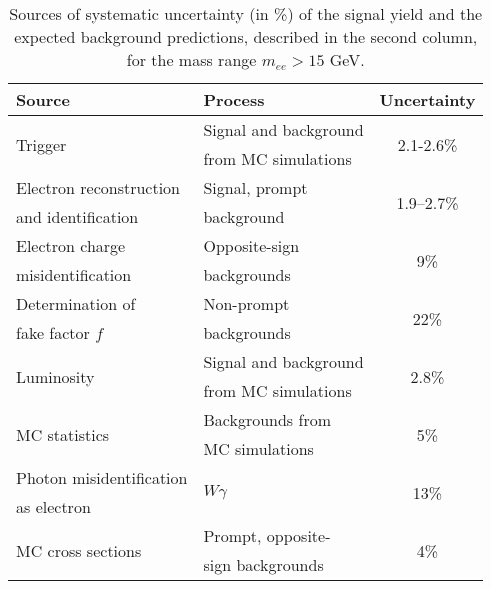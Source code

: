 \begin{table}[ht]
\begin{center}
\begin{tabular}{l|l|c}
Source & Process & Uncertainty \\
\hline
\multirow{2}{*}{Trigger} & Signal and background & \multirow{2}{*}{2.1-2.6\%}  \\
& from MC simulations &\\
\hline
Electron reconstruction & Signal, prompt &\multirow{2}{*}{1.9--2.7\%}\\
and identification & background&\\\hline
Electron charge  & Opposite-sign& \multirow{2}{*}{9\%} \\
misidentification& backgrounds&\\\hline
Determination of & Non-prompt &\multirow{2}{*}{22\%}\\
fake factor $f$& backgrounds&  \\\hline
\multirow{2}{*}{Luminosity} & Signal and background& \multirow{2}{*}{2.8\%}\\
& from MC simulations&\\\hline
\multirow{2}{*}{MC statistics} & Backgrounds from &  \multirow{2}{*}{5\%}\\
& MC simulations &\\\hline
Photon misidentification & \multirow{2}{*}{$W\gamma$} & \multirow{2}{*}{13\%}\\
as electron&&\\\hline
\multirow{2}{*}{MC cross sections} & Prompt, opposite-& \multirow{2}{*}{4\%}\\
& sign backgrounds & \\
\end{tabular}
\end{center}
\caption{Sources of systematic uncertainty (in \%) of the signal yield and the expected background predictions, described in the second column, for the mass range $m_{ee} > 15$ GeV.
}
\label{tab:syst}
\end{table}


